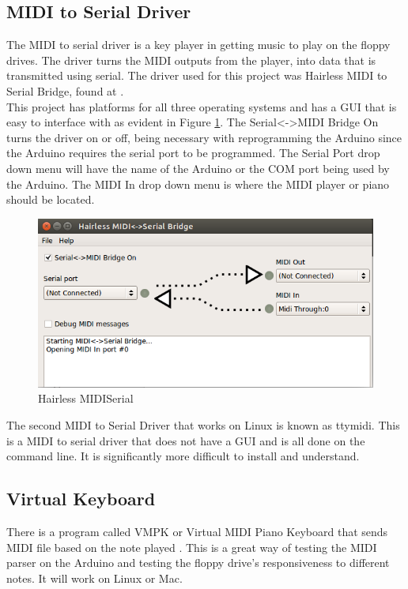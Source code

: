 \documentclass[11pt, a4paper]{report}
\begin{document}
\subsection{MIDI to Serial Driver}

The MIDI to serial driver is a key player in getting music to play on the floppy drives. The driver turns the MIDI outputs from the player, into data that is transmitted using serial. The driver used for this project was Hairless MIDI to Serial Bridge, found at \cite{HairlessMIDI}. \\

This project has platforms for all three operating systems and has a GUI that is easy to interface with as evident in Figure \ref{fig:hairless}. The Serial<->MIDI Bridge On turns the driver on or off, being necessary with reprogramming the Arduino since the Arduino requires the serial port to be programmed. The Serial Port drop down menu will have the name of the Arduino or the COM port being used by the Arduino. The MIDI In drop down menu is where the MIDI player or piano should be located. \\


\begin{figure}[H]
\hspace*{-2cm}    
    \centering
    \includegraphics[width=.75\textwidth]{MIDISerial_Bridge.png}
    \caption{Hairless MIDISerial}
    \label{fig:hairless}
\end{figure} 

The second MIDI to Serial Driver that works on Linux is known as ttymidi. This is a MIDI to serial driver that does not have a GUI and is all done on the command line. It is significantly more difficult to install and understand.

\subsection{Virtual Keyboard}

There is a program called VMPK or Virtual MIDI Piano Keyboard that sends MIDI file based on the note played \cite{VMPK}. This is a great way of testing the MIDI parser on the Arduino and testing the floppy drive's responsiveness to different notes. It will work on Linux or Mac.  
\end{document}
